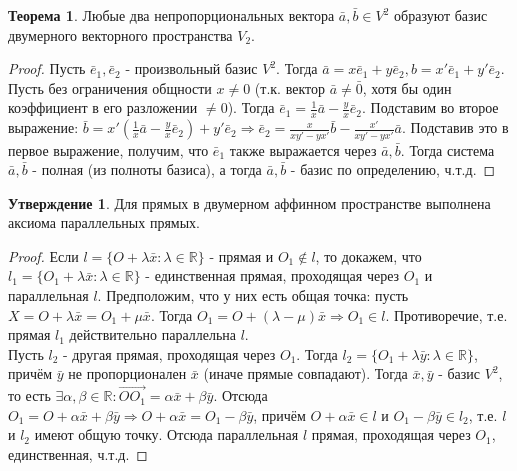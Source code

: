 \documentclass[a4paper, 12pt]{article}
\theoremstyle{definition}
\newtheorem*{theorem}{Теорема}
\newtheorem*{subtheorem}{Утверждение}
\begin{document}
	\begin{theorem}
		Любые два непропорциональных вектора $\bar{a}, \bar{b} \in V^2$ образуют базис двумерного векторного пространства $V_{2}$.
	\end{theorem}
	\begin{proof}
		Пусть $\bar{e}_{1}, \bar{e}_{2}$ - произвольный базис $V^2$. Тогда $\bar{a} = x\bar{e}_{1} + y\bar{e}_{2}, b = x'\bar{e}_{1} + y'\bar{e}_{2}$. Пусть без ограничения общности $x \neq 0$ (т.к. вектор $\bar{a} \neq \bar{0}$, хотя бы один коэффициент в его разложении $\neq0$). Тогда $\bar{e}_{1} = \frac{1}{x}\bar{a} - \frac{y}{x}\bar{e}_{2}$. Подставим во второе выражение: $\bar{b} = x'(\frac{1}{x}\bar{a} - \frac{y}{x}\bar{e}_{2}) + y'\bar{e}_{2} \Rightarrow \bar{e}_{2} = \frac{x}{xy'-yx'}\bar{b} - \frac{x'}{xy'-yx'}\bar{a}$. Подставив это в первое выражение, получим, что $\bar{e}_{1}$ также выражается через $\bar{a}, \bar{b}$. Тогда система $\bar{a}, \bar{b}$ - полная (из полноты базиса), а тогда $\bar{a}, \bar{b}$ - базис по определению, ч.т.д. 
	\end{proof}
	\begin{subtheorem}
		Для прямых в двумерном аффинном пространстве выполнена аксиома параллельных прямых.
	\end{subtheorem}
	\begin{proof}
		Если $l = \{O + \lambda\bar{x}: \lambda\in\mathbb{R}\}$ - прямая и $O_{1}\notin l$, то докажем, что $l_{1} = \{O_{1} + \lambda\bar{x}: \lambda\in\mathbb{R}\}$ - единственная прямая, проходящая через $O_{1}$ и параллельная $l$.
		Предположим, что у них есть общая точка: пусть $X = O + \lambda\bar{x} = O_{1} + \mu\bar{x}$. Тогда $O_{1} = O + (\lambda - \mu)\bar{x} \Rightarrow O_{1} \in l$. Противоречие, т.е. прямая $l_{1}$ действительно параллельна $l$.\\
		Пусть $l_{2}$ - другая прямая, проходящая через $O_{1}$. Тогда $l_{2} = \{O_{1} + \lambda\bar{y}: \lambda\in\mathbb{R}\}$, причём $\bar{y}$ не пропорционален $\bar{x}$ (иначе прямые совпадают). Тогда $\bar{x}, \bar{y}$ - базис $V^2$, то есть $\exists\alpha,\beta \in \mathbb{R}: \overrightarrow{OO_{1}} = \alpha\bar{x} + \beta\bar{y}$. Отсюда $O_{1} = O + \alpha\bar{x} + \beta\bar{y} \Rightarrow O + \alpha\bar{x} = O_{1} - \beta\bar{y}$, причём $O + \alpha\bar{x} \in l$ и $O_{1} - \beta\bar{y} \in l_{2}$, т.е. $l$ и $l_{2}$ имеют общую точку. Отсюда параллельная $l$ прямая, проходящая через $O_{1}$, единственная, ч.т.д. 
	\end{proof}
\end{document}
